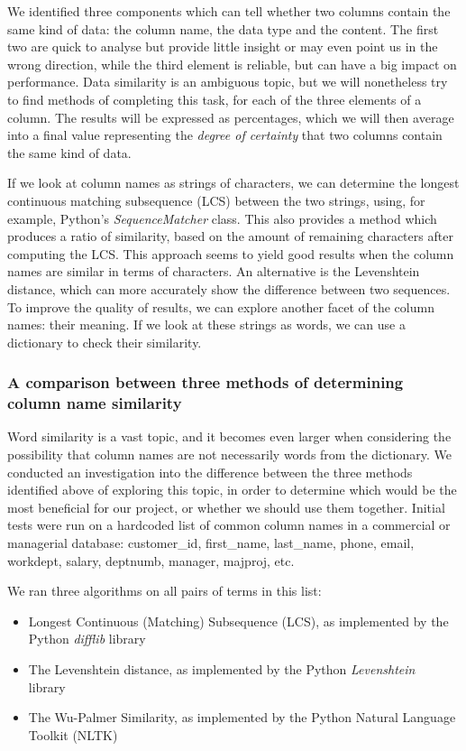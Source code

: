 \bigbreak

We identified three components which can tell whether two columns contain the same kind of data: the column name, the data
type and the content.
The first two are quick to analyse but provide little insight or may even point us in the wrong direction, while the third
element is reliable, but can have a big impact on performance.
Data similarity is an ambiguous topic, but we will nonetheless try to find methods of completing this task, for each of the
three elements of a column.
The results will be expressed as percentages, which we will then average into a final value representing the
\textit{degree of certainty} that two columns contain the same kind of data.

\bigbreak

If we look at column names as strings of characters, we can determine the longest continuous matching subsequence (LCS) between
the two strings, using, for example, Python's \textit{SequenceMatcher} class.
This also provides a method which produces a ratio of similarity, based on the amount of remaining characters after computing the LCS\@.
This approach seems to yield good results when the column names are similar in terms of characters.
An alternative is the Levenshtein distance, which can more accurately show the difference between two sequences.
To improve the quality of results, we can explore another facet of the column names: their meaning.
If we look at these strings as words, we can use a dictionary to check their similarity.

\subsubsection{A comparison between three methods of determining column name similarity}
Word similarity is a vast topic, and it becomes even larger when considering the possibility that column names are not
necessarily words from the dictionary.
We conducted an investigation into the difference between the three methods identified above of exploring this topic,
in order to determine which would be the most beneficial for our project, or whether we should use them together.
Initial tests were run on a hardcoded list of common column names in a commercial or managerial database: customer\_id,
first\_name, last\_name, phone, email, workdept, salary, deptnumb, manager, majproj, etc.

\bigbreak

We ran three algorithms on all pairs of terms in this list:
\begin{itemize}
    \item Longest Continuous (Matching) Subsequence (LCS), as implemented by the Python \textit{difflib} library~\cite{difflib}
    \item The Levenshtein distance, as implemented by the Python \textit{Levenshtein} library~\cite{Levenshtein}
    \item The Wu-Palmer Similarity, as implemented by the Python Natural Language Toolkit (NLTK)~\cite{wordnet}
\end{itemize}

